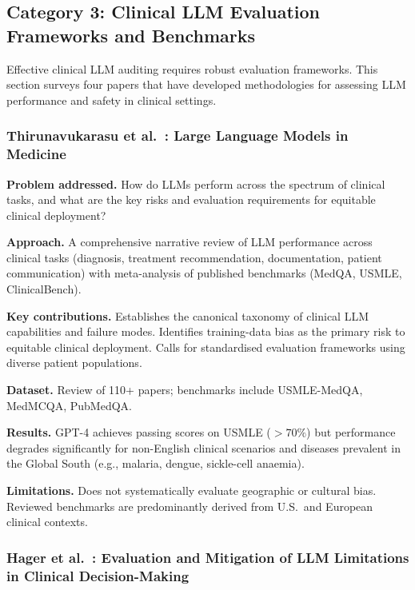 \documentclass[12pt,a4paper]{article}
\begin{document}
\subsection{Category 3: Clinical LLM Evaluation Frameworks and Benchmarks}

Effective clinical LLM auditing requires robust evaluation frameworks. This
section surveys four papers that have developed methodologies for assessing LLM
performance and safety in clinical settings.

\subsubsection*{Thirunavukarasu et al.\ \cite{thirunavukarasu2023}: Large
Language Models in Medicine}

\textbf{Problem addressed.}
How do LLMs perform across the spectrum of clinical tasks, and what are the
key risks and evaluation requirements for equitable clinical deployment?

\textbf{Approach.}
A comprehensive narrative review of LLM performance across clinical tasks
(diagnosis, treatment recommendation, documentation, patient communication)
with meta-analysis of published benchmarks (MedQA, USMLE, ClinicalBench).

\textbf{Key contributions.}
Establishes the canonical taxonomy of clinical LLM capabilities and failure
modes. Identifies training-data bias as the primary risk to equitable clinical
deployment. Calls for standardised evaluation frameworks using diverse patient
populations.

\textbf{Dataset.}
Review of 110+ papers; benchmarks include USMLE-MedQA, MedMCQA, PubMedQA.

\textbf{Results.}
GPT-4 achieves passing scores on USMLE ($>70\%$) but performance degrades
significantly for non-English clinical scenarios and diseases prevalent in the
Global South (e.g., malaria, dengue, sickle-cell anaemia).

\textbf{Limitations.}
Does not systematically evaluate geographic or cultural bias. Reviewed
benchmarks are predominantly derived from U.S.\ and European clinical contexts.

\subsubsection*{Hager et al.\ \cite{hager2024}: Evaluation and Mitigation of LLM
Limitations in Clinical Decision-Making}
\end{document}
